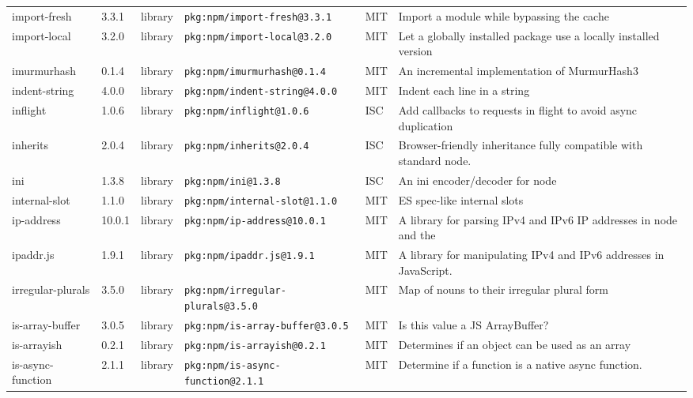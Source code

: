 \documentclass[11pt,a4paper]{article}
\begin{document}
\begin{longtable}{|p{4cm}|p{2cm}|p{1.6cm}|p{5cm}|p{1.5cm}|p{3.5cm}|}
\raggedright import-fresh & 3.3.1 & library & \small\texttt{pkg:npm/import-fresh@3.3.1} & MIT & \small Import a module while bypassing the cache \\
\raggedright import-local & 3.2.0 & library & \small\texttt{pkg:npm/import-local@3.2.0} & MIT & \small Let a globally installed package use a locally installed version  \\
\raggedright imurmurhash & 0.1.4 & library & \small\texttt{pkg:npm/imurmurhash@0.1.4} & MIT & \small An incremental implementation of MurmurHash3 \\
\raggedright indent-string & 4.0.0 & library & \small\texttt{pkg:npm/indent-string@4.0.0} & MIT & \small Indent each line in a string \\
\raggedright inflight & 1.0.6 & library & \small\texttt{pkg:npm/inflight@1.0.6} & ISC & \small Add callbacks to requests in flight to avoid async duplication \\
\raggedright inherits & 2.0.4 & library & \small\texttt{pkg:npm/inherits@2.0.4} & ISC & \small Browser-friendly inheritance fully compatible with standard node. \\
\raggedright ini & 1.3.8 & library & \small\texttt{pkg:npm/ini@1.3.8} & ISC & \small An ini encoder/decoder for node \\
\raggedright internal-slot & 1.1.0 & library & \small\texttt{pkg:npm/internal-slot@1.1.0} & MIT & \small ES spec-like internal slots \\
\raggedright ip-address & 10.0.1 & library & \small\texttt{pkg:npm/ip-address@10.0.1} & MIT & \small A library for parsing IPv4 and IPv6 IP addresses in node and the  \\
\raggedright ipaddr.js & 1.9.1 & library & \small\texttt{pkg:npm/ipaddr.js@1.9.1} & MIT & \small A library for manipulating IPv4 and IPv6 addresses in JavaScript. \\
\raggedright irregular-plurals & 3.5.0 & library & \small\texttt{pkg:npm/irregular-plurals@3.5.0} & MIT & \small Map of nouns to their irregular plural form \\
\raggedright is-array-buffer & 3.0.5 & library & \small\texttt{pkg:npm/is-array-buffer@3.0.5} & MIT & \small Is this value a JS ArrayBuffer? \\
\raggedright is-arrayish & 0.2.1 & library & \small\texttt{pkg:npm/is-arrayish@0.2.1} & MIT & \small Determines if an object can be used as an array \\
\raggedright is-async-function & 2.1.1 & library & \small\texttt{pkg:npm/is-async-function@2.1.1} & MIT & \small Determine if a function is a native async function. \\

\end{longtable}
\end{document}
